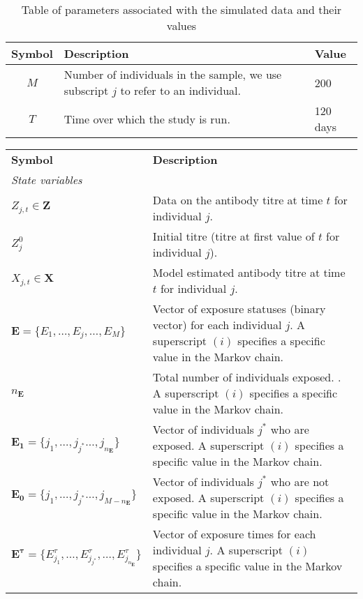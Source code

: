 \documentclass{article}
\begin{document}
\begin{table}[ht]
    \centering
    \begin{tabular}{|c|l| l| }
         \hline
        \textbf{Symbol} & \textbf{Description} & \textbf{Value}\\
        \hline
         $M$ & Number of individuals in the sample, we use subscript $j$ to refer to an individual.& 200 \\
         \hline
         $T$ & Time over which the study is run.  & 120 days \\
                  \hline
    \end{tabular}
    \caption{Table of parameters associated with the simulated data and their values}
    \label{tab:state_var}
\end{table}

\begin{table}[ht]
    \centering
    \begin{tabular}{| l | p{} |}
         \hline
        \textbf{Symbol} & \textbf{Description} \\
        \textit{State variables} & \\
               \hline
        $Z_{j, t} \in \mathbf{Z}$ & Data on the antibody titre at time $t$ for individual $j$. \\
        \hline
        $Z^0_j$ & Initial titre (titre at first value of $t$ for individual $j$). \\ 
        \hline
         $X_{j, t} \in \mathbf{X}$ & Model estimated antibody titre at time $t$ for individual $j$. \\
        \hline
        $\mathbf{E} = \{E_1, \dots, E_j, \dots, E_M\}$ &Vector of exposure statuses (binary vector) for each individual $j$. A superscript $(i)$ specifies a specific value in the Markov chain.\\
	\hline
        $n_\mathbf{E}$ & Total number of individuals exposed. . A superscript $(i)$ specifies a specific value in the Markov chain.\\
	\hline
        $\mathbf{E_{1}} = \{j_1, \dots,j_{j^*} \dots, j_{n_\mathbf{E}}\}$ & Vector of individuals $j^*$ who are exposed. A superscript $(i)$ specifies a specific value in the Markov chain.\\
	\hline
        $\mathbf{E_{0}} = \{j_1, \dots,j_{j^*} \dots, j_{M - n_\mathbf{E}}\}$ & Vector of individuals $j^*$ who are not exposed. A superscript $(i)$ specifies a specific value in the Markov chain.\\
	\hline
        $\mathbf{E^\tau} = \{E^\tau_{j_1}, \dots, E^\tau_{j_{j^*}}, \dots, E^\tau_{j_{n_\mathbf{E}}}\}$ & Vector of exposure times for each individual $j$. A superscript $(i)$ specifies a specific value in the Markov chain.\\

\end{tabular}
\end{table}
\end{document}
